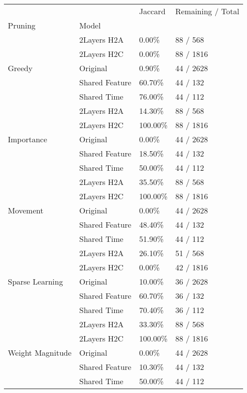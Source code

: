 \begin{tabular}{llll}
\toprule
 &  & Jaccard & Remaining / Total \\
Pruning & Model &  &  \\
\midrule
\multirow[t]{5}{*}{Greedy} & 2Layers H2A & 0.00\% & 88 / 568 \\
 & 2Layers H2C & 0.00\% & 88 / 1816 \\
 & Original & 0.90\% & 44 / 2628 \\
 & Shared Feature & 60.70\% & 44 / 132 \\
 & Shared Time & 76.00\% & 44 / 112 \\
\cline{1-4}
\multirow[t]{5}{*}{Importance} & 2Layers H2A & 14.30\% & 88 / 568 \\
 & 2Layers H2C & 100.00\% & 88 / 1816 \\
 & Original & 0.00\% & 44 / 2628 \\
 & Shared Feature & 18.50\% & 44 / 132 \\
 & Shared Time & 50.00\% & 44 / 112 \\
\cline{1-4}
\multirow[t]{5}{*}{Movement} & 2Layers H2A & 35.50\% & 88 / 568 \\
 & 2Layers H2C & 100.00\% & 88 / 1816 \\
 & Original & 0.00\% & 44 / 2628 \\
 & Shared Feature & 48.40\% & 44 / 132 \\
 & Shared Time & 51.90\% & 44 / 112 \\
\cline{1-4}
\multirow[t]{5}{*}{Sparse Learning} & 2Layers H2A & 26.10\% & 51 / 568 \\
 & 2Layers H2C & 0.00\% & 42 / 1816 \\
 & Original & 10.00\% & 36 / 2628 \\
 & Shared Feature & 60.70\% & 36 / 132 \\
 & Shared Time & 70.40\% & 36 / 112 \\
\cline{1-4}
\multirow[t]{5}{*}{Weight Magnitude} & 2Layers H2A & 33.30\% & 88 / 568 \\
 & 2Layers H2C & 100.00\% & 88 / 1816 \\
 & Original & 0.00\% & 44 / 2628 \\
 & Shared Feature & 10.30\% & 44 / 132 \\
 & Shared Time & 50.00\% & 44 / 112 \\
\cline{1-4}
\bottomrule
\end{tabular}

